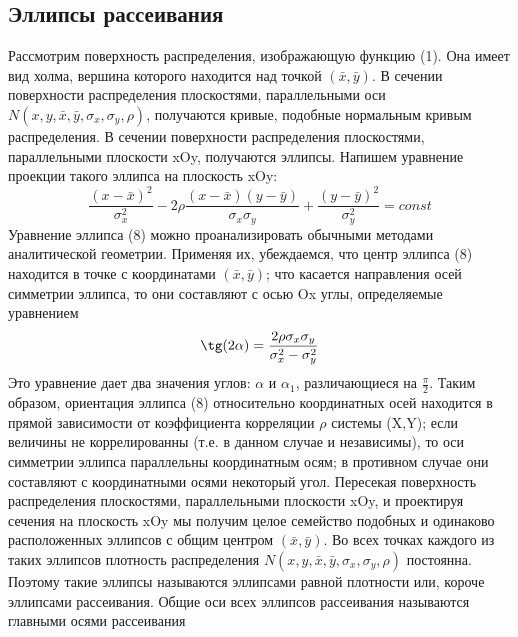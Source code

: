 \documentclass[12pt,a4paper]{scrartcl}
\begin{document}
	\subsection{Эллипсы рассеивания}
	Рассмотрим поверхность распределения, изображающую функцию (1). Она имеет вид холма, вершина которого находится над точкой $(\bar{x},\bar{y})$.
	\newline
    В сечении поверхности распределения плоскостями, параллельными оси $ N(x, y, \bar{x}, \bar{y}, \sigma_{x}, \sigma_{y}, \rho)$, получаются кривые, подобные нормальным кривым распределения. В сечении поверхности распределения плоскостями, параллельными плоскости xOy, получаются эллипсы. Напишем уравнение проекции такого эллипса на плоскость xOy: 
    \begin{equation}
        \frac{(x-\bar{x})^{2}}{\sigma_{x}^{2}} - 
        2\rho\frac{(x-\bar{x})(y-\bar{y})}{\sigma_{x}\sigma_{y}}+
        \frac{(y-\bar{y})^{2}}{\sigma_{y}^{2}} = const
        \label{ellipse}
    \end{equation}
    Уравнение эллипса (8) можно проанализировать обычными методами аналитической геометрии. Применяя их, убеждаемся, что центр эллипса (8) находится в точке с координатами $(\bar{x},\bar{y})$; что касается направления осей симметрии эллипса, то они составляют с осью Ox углы, определяемые уравнением
    \begin{equation}
        \tg(2\alpha) = \frac{2\rho\sigma_{x}\sigma_{y}}{\sigma_{x}^{2} - \sigma_{y}^{2}}
        \label{angle}
    \end{equation}
    Это уравнение дает два значения углов: $\alpha$ и $\alpha_{1}$, различающиеся на $\frac{\pi}{2}$.
    \newline
    Таким образом, ориентация эллипса (8) относительно координатных осей находится в прямой зависимости от коэффициента корреляции $\rho$ системы (X,Y); если величины не коррелированны (т.е. в данном случае и независимы), то оси симметрии эллипса параллельны координатным осям; в противном случае они составляют с координатными осями некоторый угол.
    \newline
    Пересекая поверхность распределения плоскостями, параллельными плоскости xOy, и проектируя сечения на плоскость xOy мы получим целое семейство подобных и одинаково расположенных эллипсов с общим центром $(\bar{x},\bar{y})$. Во всех точках каждого из таких эллипсов плотность распределения $ N(x, y, \bar{x}, \bar{y}, \sigma_{x}, \sigma_{y}, \rho)$ постоянна. Поэтому такие эллипсы называются эллипсами равной плотности или, короче эллипсами рассеивания. Общие оси всех эллипсов рассеивания называются главными осями рассеивания
\end{document}
